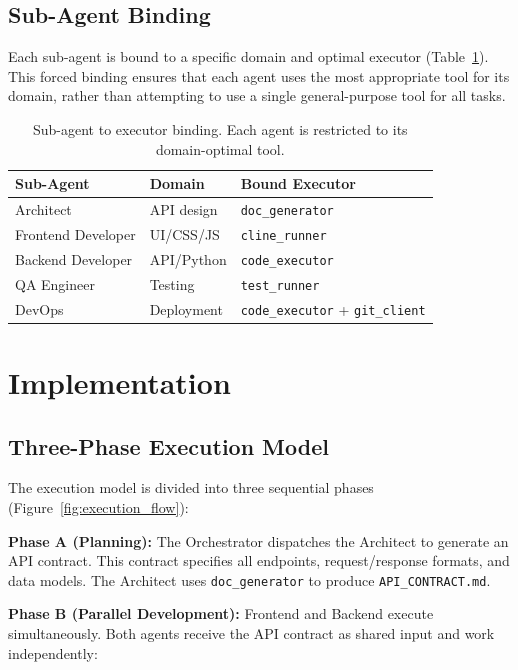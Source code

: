 \documentclass[12pt]{article}
\begin{document}
\subsection{Sub-Agent Binding}

Each sub-agent is bound to a specific domain and optimal executor (Table~\ref{tab:agent_binding}). This forced binding ensures that each agent uses the most appropriate tool for its domain, rather than attempting to use a single general-purpose tool for all tasks.

\begin{table}[htbp]
\centering
\caption{Sub-agent to executor binding. Each agent is restricted to its domain-optimal tool.}
\label{tab:agent_binding}
\begin{tabular}{lll}
\toprule
\textbf{Sub-Agent} & \textbf{Domain} & \textbf{Bound Executor} \\
\midrule
Architect & API design & \texttt{doc\_generator} \\
Frontend Developer & UI/CSS/JS & \texttt{cline\_runner} \\
Backend Developer & API/Python & \texttt{code\_executor} \\
QA Engineer & Testing & \texttt{test\_runner} \\
DevOps & Deployment & \texttt{code\_executor} + \texttt{git\_client} \\
\bottomrule
\end{tabular}
\end{table}

\section{Implementation}

\subsection{Three-Phase Execution Model}

The execution model is divided into three sequential phases (Figure~\ref{fig:execution_flow}):

\textbf{Phase A (Planning):} The Orchestrator dispatches the Architect to generate an API contract. This contract specifies all endpoints, request/response formats, and data models. The Architect uses \texttt{doc\_generator} to produce \texttt{API\_CONTRACT.md}.

\textbf{Phase B (Parallel Development):} Frontend and Backend execute simultaneously. Both agents receive the API contract as shared input and work independently:
\end{document}
